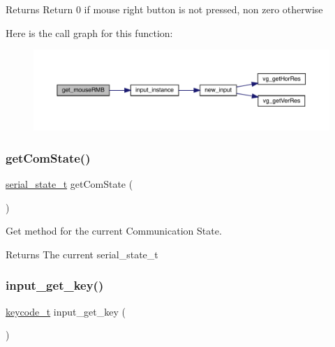 \begin{DoxyReturn}{Returns}
Return 0 if mouse right button is not pressed, non zero otherwise 
\end{DoxyReturn}
Here is the call graph for this function\+:\nopagebreak
\begin{figure}[H]
\begin{center}
\leavevmode
\includegraphics[width=350pt]{group___input_ga5d6fc0beedad492333795ddff18c20b9_cgraph}
\end{center}
\end{figure}
\hypertarget{group___input_gadf520a08e359e983d9cfb73a8b714fc2}{}\label{group___input_gadf520a08e359e983d9cfb73a8b714fc2} 
\subsubsection{\texorpdfstring{get\+Com\+State()}{getComState()}}
{\footnotesize\ttfamily \hyperlink{group___input_gad2eda33b1d20e895223c0ebbb339bde8}{serial\+\_\+state\+\_\+t} get\+Com\+State (\begin{DoxyParamCaption}{ }\end{DoxyParamCaption})}



Get method for the current Communication State. 

\begin{DoxyReturn}{Returns}
The current serial\+\_\+state\+\_\+t 
\end{DoxyReturn}
\hypertarget{group___input_ga4abaa84a7ae0505c6acab391f82ab1ac}{}\label{group___input_ga4abaa84a7ae0505c6acab391f82ab1ac} 
\subsubsection{\texorpdfstring{input\+\_\+get\+\_\+key()}{input\_get\_key()}}
{\footnotesize\ttfamily \hyperlink{group___input_ga6e68664bf6d0e0a4dac76a07ae630c52}{keycode\+\_\+t} input\+\_\+get\+\_\+key (\begin{DoxyParamCaption}{ }\end{DoxyParamCaption})}



